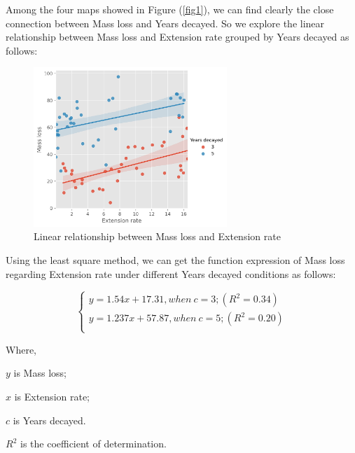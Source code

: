 Among the four maps showed in Figure (\ref{fig1}), we can find clearly the close connection between Mass loss and Years decayed. So we explore the linear relationship between Mass loss and Extension rate grouped by Years decayed as follows:
\begin{figure}[H]
    \centering
    \includegraphics[width=0.65\textwidth]{./code/fig2.jpg}
    \caption{Linear relationship between Mass loss and Extension rate}\label{fig2}
\end{figure}

Using the least square method, we can get the function expression of Mass loss regarding Extension rate under different Years decayed conditions as follows:

\begin{equation}\label{}
\left\{
\begin{array}{l}
    y=1.54x+17.31, when\ c = 3; (R^2=0.34)\\
    y=1.237x+57.87, when\ c = 5; (R^2=0.20) \\
\end{array}
\right.
\end{equation}

Where,

$y$ is Mass loss;

$x$ is Extension rate;

$c$ is Years decayed.

$R^2$ is the coefficient of determination.
